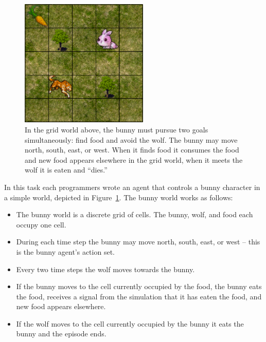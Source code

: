 \begin{figure}[h]

\begin{center}
\includegraphics[height=2.4in]{bunny.png}
\end{center}


\caption{In the grid world above, the bunny must pursue two goals
  simultaneously: find food and avoid the wolf.  The bunny may move
  north, south, east, or west.  When it finds food it consumes the
  food and new food appears elsewhere in the grid world, when it meets
  the wolf it is eaten and ``dies.''}
\label{fig:bunny-picture}
\end{figure}

In this task each programmers wrote an agent that controls a bunny character in a simple world, depicted in Figure~\ref{fig:bunny-picture}.  The bunny world works as follows:

\begin{itemize}

\item The bunny world is a discrete grid of cells.  The bunny, wolf, and food each occupy one cell.

\item During each time step the bunny may move north, south, east, or west -- this is the bunny agent's action set.

\item Every two time steps the wolf moves towards the bunny.

\item If the bunny moves to the cell currently occupied by the food, the bunny eats the food, receives a signal from the simulation that it has eaten the food, and new food appears elsewhere.

\item If the wolf moves to the cell currently occupied by the bunny it eats the bunny and the episode ends.

\end{itemize}


